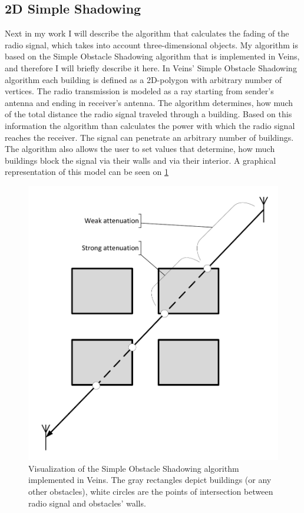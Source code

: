 \documentclass[]{nsm-thesis}
\begin{document}
\subsection{2D Simple Shadowing}

Next in my work I will describe the algorithm that calculates the fading of the radio signal, which takes into account three-dimensional objects. My algorithm is based on the Simple Obstacle Shadowing algorithm \cite{SimpleObstacleShadowing} that is implemented in Veins, and therefore I will briefly describe it here. In Veins' Simple Obstacle Shadowing algorithm each building is defined as a 2D-polygon with arbitrary number of vertices. The radio transmission is modeled as a ray starting from sender's antenna and ending in receiver's antenna. The algorithm determines, how much of the total distance the radio signal traveled through a building. Based on this information the algorithm than calculates the power with which the radio signal reaches the receiver. The signal can penetrate an arbitrary number of buildings. The algorithm also allows the user to set values that determine, how much buildings block the signal via their walls and via their interior. A graphical representation of this model can be seen on \cref{fig:SimpleObstacleShadowing}

\begin{figure}
	\centering
	\includegraphics[width=1\textwidth]{figures/SimpleObstacleShadowing.pdf}
	\caption{Visualization of the Simple Obstacle Shadowing algorithm implemented in Veins. The gray rectangles depict buildings (or any other obstacles), white circles are the points of intersection between radio signal and obstacles' walls.}
	\label{fig:SimpleObstacleShadowing}
\end{figure}
\end{document}
